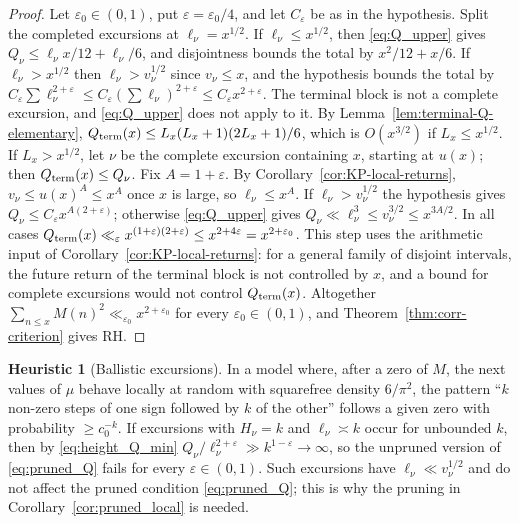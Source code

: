 \documentclass[11pt]{amsart}
\numberwithin{equation}{section}
\theoremstyle{plain}
\theoremstyle{definition}
\newtheorem{heuristic}[theorem]{Heuristic}
\theoremstyle{remark}
\newcommand{\eps}{\varepsilon}
\begin{document}
\begin{proof}
Let $\eps_0\in(0,1)$, put $\eps=\eps_0/4$, and let $C_\eps$ be as in the
hypothesis. Split the completed excursions at $\ell_\nu=x^{1/2}$. If
$\ell_\nu\le x^{1/2}$, then \eqref{eq:Q_upper} gives
$Q_\nu\le\ell_\nu x/12+\ell_\nu/6$, and disjointness bounds the total by
$x^2/12+x/6$. If $\ell_\nu>x^{1/2}$ then $\ell_\nu>v_\nu^{1/2}$ since
$v_\nu\le x$, and the hypothesis bounds the total by
$C_\eps\sum\ell_\nu^{2+\eps}\le C_\eps(\sum\ell_\nu)^{2+\eps}\le C_\eps x^{2+\eps}$.
The terminal block is not a complete excursion, and \eqref{eq:Q_upper} does
not apply to it. By Lemma~\ref{lem:terminal-Q-elementary},
$Q_{\rm term}(x)\le L_x(L_x+1)(2L_x+1)/6$, which is $O(x^{3/2})$ if $L_x\le x^{1/2}$. If $L_x>x^{1/2}$, let $\nu$ be the
complete excursion containing $x$, starting at $u(x)$; then
$Q_{\rm term}(x)\le Q_\nu$. Fix $A=1+\eps$. By
Corollary~\ref{cor:KP-local-returns}, $v_\nu\le u(x)^A\le x^A$ once $x$ is
large, so $\ell_\nu\le x^A$. If $\ell_\nu>v_\nu^{1/2}$ the hypothesis gives
$Q_\nu\le C_\eps x^{A(2+\eps)}$; otherwise \eqref{eq:Q_upper} gives
$Q_\nu\ll\ell_\nu^3\le v_\nu^{3/2}\le x^{3A/2}$. In all cases
$Q_{\rm term}(x)\ll_\eps x^{(1+\eps)(2+\eps)}\le x^{2+4\eps}=x^{2+\eps_0}$. This step uses the arithmetic
input of Corollary~\ref{cor:KP-local-returns}: for a general family of
disjoint intervals, the future return of the terminal block is not
controlled by $x$, and a bound for complete excursions would not control
$Q_{\rm term}(x)$. Altogether
$\sum_{n\le x}M(n)^2\ll_{\eps_0}x^{2+\eps_0}$ for every $\eps_0\in(0,1)$,
and Theorem~\ref{thm:corr-criterion} gives RH.
\end{proof}

\begin{heuristic}[Ballistic excursions]
\label{heu:local_fails}
In a model where, after a zero of $M$, the next values of $\mu$ behave
locally at random with squarefree density $6/\pi^2$, the pattern ``$k$
non-zero steps of one sign followed by $k$ of the other'' follows a given
zero with probability $\ge c_0^{-k}$. If excursions with $H_\nu=k$ and
$\ell_\nu\asymp k$ occur for unbounded $k$, then by \eqref{eq:height_Q_min}
$Q_\nu/\ell_\nu^{2+\eps}\gg k^{1-\eps}\to\infty$, so the unpruned version of
\eqref{eq:pruned_Q} fails for every $\eps\in(0,1)$. Such excursions have
$\ell_\nu\ll v_\nu^{1/2}$ and do not affect the pruned condition
\eqref{eq:pruned_Q}; this is why the pruning in
Corollary~\ref{cor:pruned_local} is needed.
\end{heuristic}
\end{document}
